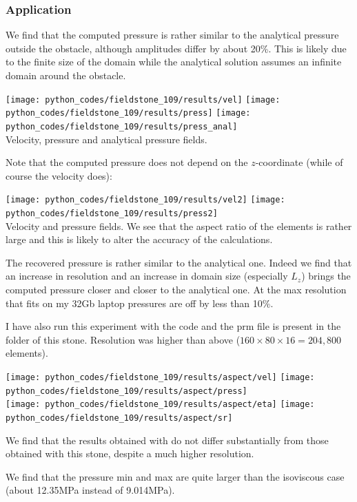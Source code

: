 \subsubsection*{Application}

We find that the computed pressure is rather similar to the analytical pressure outside the 
obstacle, although amplitudes differ by about 20\%. This is likely due to the finite 
size of the domain while the analytical solution assumes an infinite domain 
around the obstacle.

\begin{center}
\texttt{[image: python\_codes/fieldstone\_109/results/vel]}
\texttt{[image: python\_codes/fieldstone\_109/results/press]}
\texttt{[image: python\_codes/fieldstone\_109/results/press\_anal]}\\
{\captionfont Velocity, pressure and analytical pressure fields. }
\end{center}

Note that the computed pressure does not depend on the $z$-coordinate (while of course the velocity does): 
\begin{center}
\texttt{[image: python\_codes/fieldstone\_109/results/vel2]}
\texttt{[image: python\_codes/fieldstone\_109/results/press2]}\\
{\captionfont Velocity and pressure fields. We see that the aspect ratio of the elements
is rather large and this is likely to alter the accuracy of the calculations.}
\end{center}

The recovered pressure is rather similar to the analytical one. Indeed we find that an increase in resolution and 
an increase in domain size (especially $L_z$) brings the computed pressure closer and closer to the 
analytical one. At the max resolution that fits on my 32Gb laptop pressures are off by less than 10\%.

I have also run this experiment with the \aspect code and the prm file is present in 
the folder of this stone. Resolution was higher than above ($160 \times 80 \times 16 =204,800$ elements).

\begin{center}
\texttt{[image: python\_codes/fieldstone\_109/results/aspect/vel]}
\texttt{[image: python\_codes/fieldstone\_109/results/aspect/press]}\\
\texttt{[image: python\_codes/fieldstone\_109/results/aspect/eta]}
\texttt{[image: python\_codes/fieldstone\_109/results/aspect/sr]}
\end{center}

We find that the results obtained with \aspect do not differ substantially from those
obtained with this stone, despite a much higher resolution.

We find that the pressure min and max are quite larger than the isoviscous case (about 12.35MPa instead 
of 9.014MPa).  



